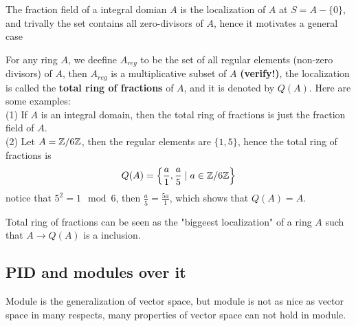 \documentclass[12pt,a4paper]{article}
\begin{document}
    The fraction field of a integral domian \(A\) is the localization of \(A\) at \(S = A-\{0\}\), and trivally the set contains all zero-divisors of \(A\), hence it motivates a general case
    \begin{example}
        For any ring \(A\), we deefine \(A_{reg}\) to be the set of all regular elements (non-zero divisors) of \(A\), then \(A_{reg}\) is a multiplicative subset of \(A\) \textbf{(verify!)}, the localization is called the \textbf{total ring of fractions} of \(A\), and it is denoted by \(Q(A)\). Here are some examples:\\

        (1) If \(A\) is an integral domain, then the total ring of fractions is just the fraction field of \(A\).\\

        (2) Let \(A = \mathbb{Z}/6\mathbb{Z}\), then the regular elements are \(\{1,5\}\), hence the total ring of fractions is
        \[Q(A) = \left\{\frac{a}{1}, \frac{a}{5} \mid a \in \mathbb{Z}/6\mathbb{Z}\right\} \]
        notice that \(5^2 = 1 \mod 6\), then \(\frac{a}{5} = \frac{5a}{1}\), which shows that \(Q(A) = A\).\\
    \end{example}

    Total ring of fractions can be seen as the "biggeest localization" of a ring \(A\) such that \(A \to Q(A)\) is a inclusion.

\subsection{PID and modules over it}


Module is the generalization of vector space, but module is not as nice as vector space in many respects, many properties of vector space can not hold in module.
\end{document}
